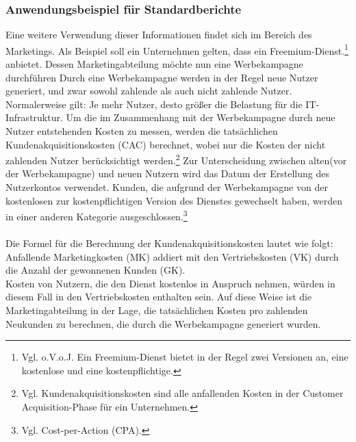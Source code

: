 \subsubsection*{Anwendungsbeispiel für Standardberichte}
Eine weitere Verwendung dieser Informationen findet sich im Bereich des Marketings. Als Beispiel soll ein Unternehmen gelten, dass ein Freemium-Dienst.\footnote{Vgl. o.V.o.J. Ein Freemium-Dienst bietet in der Regel zwei Versionen an, eine kostenlose und eine kostenpflichtige\cite{MAR2}.} anbietet. Dessen Marketingabteilung möchte nun eine Werbekampagne durchführen Durch eine Werbekampagne werden in der Regel neue Nutzer generiert, und zwar sowohl zahlende als auch nicht zahlende Nutzer. Normalerweise gilt: Je mehr Nutzer, desto größer die Belastung für die IT-Infrastruktur. Um die im Zusammenhang mit der Werbekampagne durch neue Nutzer entstehenden Kosten zu messen, werden die tatsächlichen Kundenakquisitionskosten (CAC) berechnet, wobei nur die Kosten der nicht zahlenden Nutzer berücksichtigt werden.\footnote{Vgl. Kundenakquisitionskosten sind alle anfallenden Kosten in der Customer Acquisition-Phase für ein Unternehmen\cite{MAR1}.} Zur Unterscheidung zwischen alten(vor der Werbekampagne) und neuen Nutzern wird das Datum der Erstellung des Nutzerkontos verwendet. Kunden, die aufgrund der Werbekampagne von der kostenlosen zur kostenpflichtigen Version des Dienstes gewechselt haben, werden in einer anderen Kategorie ausgeschlossen.\footnote{Vgl. Cost-per-Action (CPA)\cite{MAR3}.}
\\\\ 
Die Formel für die Berechnung der Kundenakquisitionskosten lautet wie folgt:\\
Anfallende Marketingkosten (MK) addiert mit den Vertriebskosten (VK) durch die Anzahl der gewonnenen Kunden (GK).\\
Kosten von Nutzern, die den Dienst kostenlos in Anspruch nehmen, würden in diesem Fall in den Vertriebskosten enthalten sein. Auf diese Weise ist die Marketingabteilung in der Lage, die tatsächlichen Kosten pro zahlenden Neukunden zu berechnen, die durch die Werbekampagne generiert wurden.  

